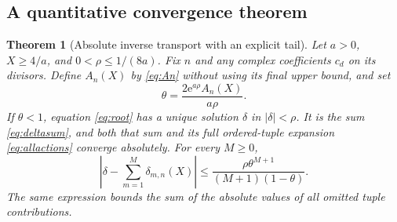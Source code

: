 \documentclass[11pt,a4paper]{article}
\numberwithin{equation}{section}
\newtheorem{theorem}{Theorem}[section]
\theoremstyle{definition}
\theoremstyle{remark}
\newcommand{\ee}{\mathrm e}
\newcommand{\abs}[1]{\left|#1\right|}
\begin{document}
\subsection{A quantitative convergence theorem}

\begin{theorem}[Absolute inverse transport with an explicit tail]
\label{thm:inverse}
Let $a>0$, $X\ge4/a$, and $0<\rho\le1/(8a)$. Fix $n$ and any
complex coefficients $c_d$ on its divisors. Define $A_n(X)$ by
\eqref{eq:An} without using its final upper bound, and set
\begin{equation}
 \theta=\frac{2\ee^{a\rho}A_n(X)}{a\rho}.
 \label{eq:theta}
\end{equation}
If $\theta<1$, equation \eqref{eq:root} has a unique solution
$\delta$ in $|\delta|<\rho$. It is the sum \eqref{eq:deltasum},
and both that sum and its full ordered-tuple expansion
\eqref{eq:allactions} converge absolutely. For every $M\ge0$,
\begin{equation}
 \abs{\delta-\sum_{m=1}^M\delta_{m,n}(X)}
 \le\frac{\rho\theta^{M+1}}{(M+1)(1-\theta)}.
 \label{eq:inverseerror}
\end{equation}
The same expression bounds the sum of the absolute values of all
omitted tuple contributions.
\end{theorem}
\end{document}
